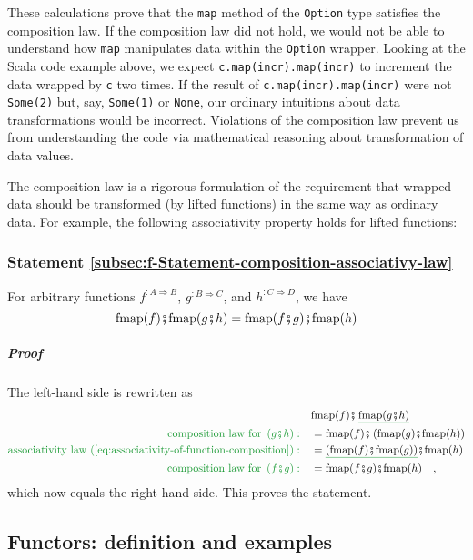 These calculations prove that the \lstinline!map! method of the \lstinline!Option!
type satisfies the composition law. If the composition law did not
hold, we would not be able to understand how \lstinline!map! manipulates
data within the \lstinline!Option! wrapper. Looking at the Scala
code example above, we expect \lstinline!c.map(incr).map(incr)! to
increment the data wrapped by \lstinline!c! two times. If the result
of \lstinline!c.map(incr).map(incr)! were not \lstinline!Some(2)!
but, say, \lstinline!Some(1)! or \lstinline!None!, our ordinary
intuitions about data transformations would be incorrect. Violations
of the composition law prevent us from understanding the code via
mathematical reasoning about transformation of data values.

The composition law is a rigorous formulation of the requirement that
wrapped data should be transformed (by lifted functions) in the same
way as ordinary data. For example, the following associativity property
holds for lifted functions:

\subsubsection{Statement \label{subsec:f-Statement-composition-associativy-law}\ref{subsec:f-Statement-composition-associativy-law}}

For arbitrary functions $f^{:A\Rightarrow B}$, $g^{:B\Rightarrow C}$,
and $h^{:C\Rightarrow D}$, we have
\[
\text{fmap}(f)\bef\text{fmap}(g\bef h)=\text{fmap}(f\bef g)\bef\text{fmap}(h)
\]


\subparagraph{Proof}

The left-hand side is rewritten as
\begin{align*}
 & \text{fmap}(f)\bef\,\gunderline{\text{fmap}(g\bef h)}\\
{\color{greenunder}\text{composition law for }\left(g\bef h\right):}\quad & =\text{fmap}(f)\bef\left(\text{fmap}(g)\bef\text{fmap}(h)\right)\\
{\color{greenunder}\text{associativity law (\ref{eq:associativity-of-function-composition})}:}\quad & =\gunderline{\left(\text{fmap}(f)\bef\text{fmap}(g)\right)}\bef\text{fmap}(h)\\
{\color{greenunder}\text{composition law for }\left(f\bef g\right):}\quad & =\text{fmap}(f\bef g)\bef\text{fmap}(h)\quad,
\end{align*}
which now equals the right-hand side. This proves the statement.

\subsection{Functors: definition and examples\label{subsec:Functors:-definition-and-examples}}

